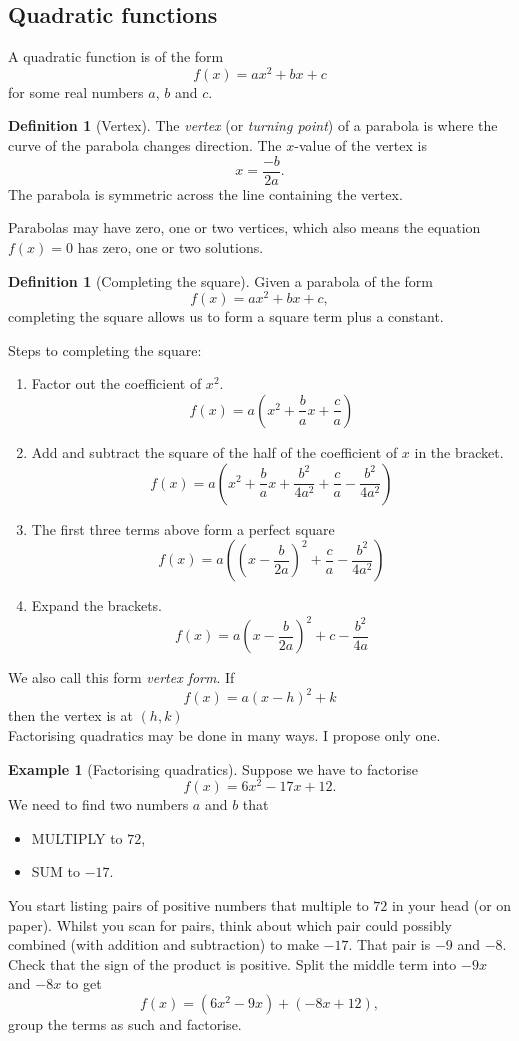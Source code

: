 \documentclass[12pt]{book}
\theoremstyle{definition}
\newtheorem{defi}[theo]{Definition}
\newtheorem{eggs}[theo]{Example}
\begin{document}
\subsection{Quadratic functions}
  A quadratic function is of the form \[f(x)=ax^2+bx+c\] for some real numbers $a$, $b$ and $c$.
  \begin{defi}[Vertex]
  The \textit{vertex} (or \textit{turning point}) of a parabola is where the curve of the parabola changes direction. The $x$-value
  of the vertex is \[x=\frac{-b}{2a}.\] The parabola is symmetric across the line containing the vertex.
  \end{defi}
  Parabolas may have zero, one or two vertices, which also means the equation $f(x)=0$ has zero, one or two solutions.
  \begin{defi}[Completing the square]
    Given a parabola of the form \[f(x)=ax^2+bx+c,\] completing the square allows us to form a square term plus a constant.
  \end{defi}
  Steps to completing the square:
  \begin{enumerate}[label=\roman*)]
    \item Factor out the coefficient of $x^2$. \[f(x)=a\left(x^2+\frac{b}{a}x+\frac{c}{a}\right)\]
    \item Add and subtract the square of the half of the coefficient of $x$ in the bracket. 
      \[f(x)=a\left(x^2+\frac{b}{a}x+\frac{b^2}{4a^2}+\frac{c}{a}-\frac{b^2}{4a^2}\right)\]
    \item The first three terms above form a perfect square \[f(x)=a\left(\left(x-\frac{b}{2a}\right)^2+\frac{c}{a}-\frac{b^2}{4a^2}\right)\]
    \item Expand the brackets.
      \[f(x)=a\left(x-\frac{b}{2a}\right)^2+c-\frac{b^2}{4a}\]
  \end{enumerate}
  We also call this form \textit{vertex form}. If \[f(x)=a(x-h)^2+k\] then the vertex is at $(h,k)$
  \bigskip\\ Factorising quadratics may be done in many ways. I propose only one.
  \begin{eggs}[Factorising quadratics]
    Suppose we have to factorise \[f(x)=6x^2-17x+12.\] We need to find two numbers $a$ and $b$ that 
    \begin{itemize}
      \item MULTIPLY to $72$,
      \item SUM to $-17$.
    \end{itemize}
    You start listing pairs of positive numbers that multiple to $72$ in your head (or on paper). Whilst you scan for pairs, think about
    which pair could possibly combined (with addition and subtraction) to make $-17$. That pair is $-9$ and $-8$. Check that
    the sign of the product is positive. Split the middle term into $-9x$ and $-8x$ to get
    \[f(x)=(6x^2-9x)+(-8x+12),\]
    group the terms as such and factorise.
  \end{eggs}
\end{document}
